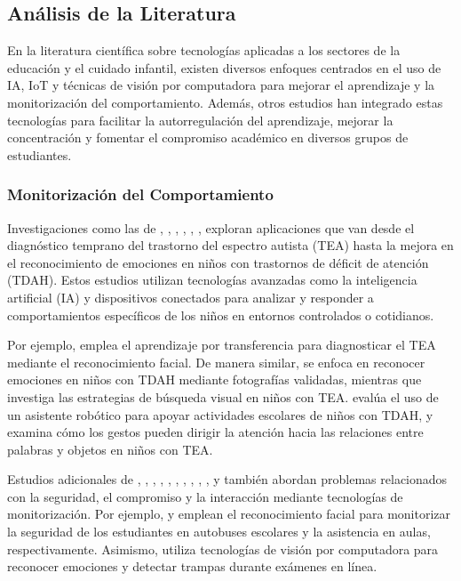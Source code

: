 \documentclass[a4paper,fleqn]{cas-sc}
\begin{document}
		
		\subsection{Análisis de la Literatura}			
			En la literatura científica sobre tecnologías aplicadas a los sectores de la educación y el cuidado infantil, existen diversos enfoques centrados en el uso de IA, IoT y técnicas de visión por computadora para mejorar el aprendizaje y la monitorización del comportamiento. Además, otros estudios han integrado estas tecnologías para facilitar la autorregulación del aprendizaje, mejorar la concentración y fomentar el compromiso académico en diversos grupos de estudiantes.
			
			\subsubsection{Monitorización del Comportamiento}
				Investigaciones como las de \cite{Akter2021}, \cite{Albrecht2014}, \cite{Berrezueta-Guzman2021}, \cite{Pelc2006}, \cite{VilliersRader2021}, \cite{Warren2015Brief}, \cite{Washington2016AWereable} exploran aplicaciones que van desde el diagnóstico temprano del trastorno del espectro autista (TEA) hasta la mejora en el reconocimiento de emociones en niños con trastornos de déficit de atención (TDAH). Estos estudios utilizan tecnologías avanzadas como la inteligencia artificial (IA) y dispositivos conectados para analizar y responder a comportamientos específicos de los niños en entornos controlados o cotidianos.
				
				Por ejemplo, \cite{Akter2021} emplea el aprendizaje por transferencia para diagnosticar el TEA mediante el reconocimiento facial. De manera similar, \cite{Pelc2006} se enfoca en reconocer emociones en niños con TDAH mediante fotografías validadas, mientras que \cite{Albrecht2014} investiga las estrategias de búsqueda visual en niños con TEA. \cite{Berrezueta-Guzman2021} evalúa el uso de un asistente robótico para apoyar actividades escolares de niños con TDAH, y \cite{VilliersRader2021} examina cómo los gestos pueden dirigir la atención hacia las relaciones entre palabras y objetos en niños con TEA.
				
				Estudios adicionales de \cite{Boumiza2017}, \cite{DaCosta2023}, \cite{Enadula2021}, \cite{Farsani2020}, \cite{Hachad2020}, \cite{James2019},  \cite{Kulkarni2023}, \cite{Kumar2024Zoom}, \cite{Muller2018ArchnSmile}, \cite{Narkhede2023}, y \cite{Ozdamli2022} también abordan problemas relacionados con la seguridad, el compromiso y la interacción mediante tecnologías de monitorización. Por ejemplo, \cite{Hachad2020} y \cite{James2019} emplean el reconocimiento facial para monitorizar la seguridad de los estudiantes en autobuses escolares y la asistencia en aulas, respectivamente. Asimismo, \cite{Ozdamli2022} utiliza tecnologías de visión por computadora para reconocer emociones y detectar trampas durante exámenes en línea.
				
\end{document}
